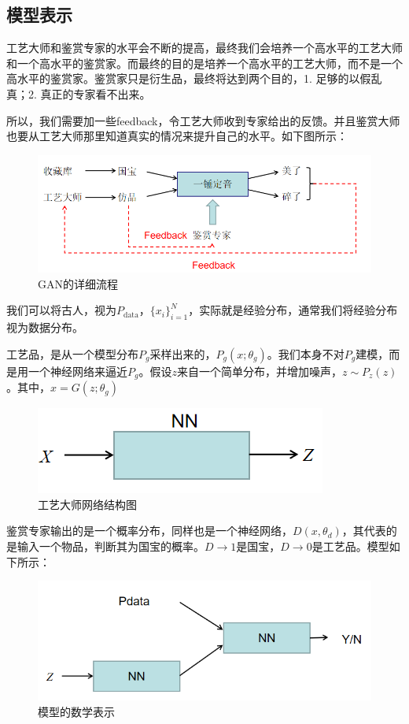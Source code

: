 \documentclass[a4paper]{article}
\begin{document}
\subsection{模型表示}
工艺大师和鉴赏专家的水平会不断的提高，最终我们会培养一个高水平的工艺大师和一个高水平的鉴赏家。而最终的目的是培养一个高水平的工艺大师，而不是一个高水平的鉴赏家。鉴赏家只是衍生品，最终将达到两个目的，1. 足够的以假乱真；2. 真正的专家看不出来。

所以，我们需要加一些feedback，令工艺大师收到专家给出的反馈。并且鉴赏大师也要从工艺大师那里知道真实的情况来提升自己的水平。如下图所示：
\begin{figure}[H]
    \centering
    \includegraphics[width=.85\textwidth]{微信图片_20200606165431.png}
    \caption{GAN的详细流程}
    \label{fig:my_label_1}
\end{figure}
我们可以将古人，视为$P_{\text{data}}$，$\{x_i\}_{i=1}^N$，实际就是经验分布，通常我们将经验分布视为数据分布。

工艺品，是从一个模型分布$P_g$采样出来的，$P_g(x;\theta_g)$。我们本身不对$P_g$建模，而是用一个神经网络来逼近$P_g$。假设$z$来自一个简单分布，并增加噪声，$z\sim P_z(z)$。其中，$x=G(z;\theta_g)$
\begin{figure}[H]
    \centering
    \includegraphics[width=.35\textwidth]{微信图片_20200606171236.png}
    \caption{工艺大师网络结构图}
    \label{fig:my_label_1}
\end{figure}
鉴赏专家输出的是一个概率分布，同样也是一个神经网络，$D(x,\theta_d)$，其代表的是输入一个物品，判断其为国宝的概率。$D\to 1$是国宝，$D\to 0$是工艺品。模型如下所示：
\begin{figure}[H]
    \centering
    \includegraphics[width=.65\textwidth]{微信图片_20200606173145.png}
    \caption{模型的数学表示}
    \label{fig:my_label_1}
\end{figure}
\end{document}
